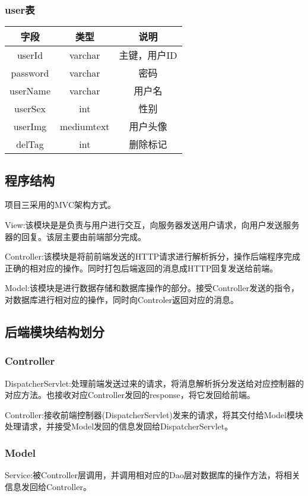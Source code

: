 \subsubsection{user表}
\begin{tabular}{c|c|c}
	\hline
	字段 & 类型 & 说明 \\
	\hline
	userId& varchar & 主键，用户ID \\
	\hline
	password & varchar & 密码 \\
	\hline
	userName & varchar & 用户名 \\
	\hline
	userSex & int & 性别 \\
	\hline
	userImg & mediumtext & 用户头像 \\
	\hline
	delTag & int & 删除标记 \\
\end{tabular}
\subsection{程序结构}
项目三采用的MVC架构方式。

View:该模块是是负责与用户进行交互，向服务器发送用户请求，向用户发送服务器的回复。该层主要由前端部分完成。

Controller:该模块是将前前端发送的HTTP请求进行解析拆分，操作后端程序完成正确的相对应的操作。同时打包后端返回的消息成HTTP回复发送给前端。

Model:该模块是进行数据存储和数据库操作的部分。接受Controller发送的指令，对数据库进行相对应的操作，同时向Controler返回对应的消息。

\subsection{后端模块结构划分}
\subsubsection{Controller}
DispatcherServlet:处理前端发送过来的请求，将消息解析拆分发送给对应控制器的对应方法。也接收对应Controller发回的response，将它发回给前端。

Controller:接收前端控制器(DispatcherServlet)发来的请求，将其交付给Model模块处理请求，并接受Model发回的信息发回给DispatcherServlet。

\subsubsection{Model}
Service:被Controller层调用，并调用相对应的Dao层对数据库的操作方法，将相关信息发回给Controller。

